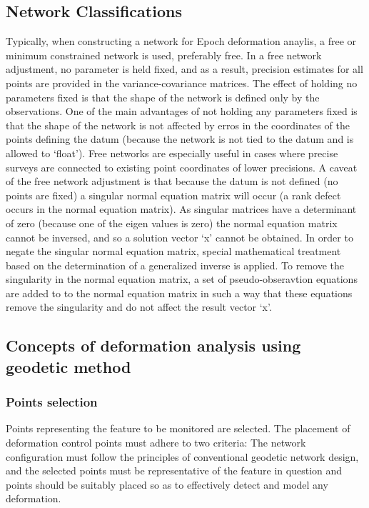 \documentclass{article}
\begin{document}
\subsection{Network Classifications}
Typically, when constructing a network for Epoch deformation anaylis,
a free or minimum constrained network is used, preferably free. In a free
network adjustment, no parameter is held fixed, and as a result, precision
estimates for all points are provided in the variance-covariance matrices.
The effect of holding no parameters fixed is that the shape of the network
is defined only by the observations. One of the main advantages of not holding
any parameters fixed is that the shape of the network is not affected by erros in
the coordinates of the points defining the datum (because the network is not tied
to the datum and is allowed to `float'). Free networks are especially useful
in cases where precise surveys are connected to existing point coordinates
of lower precisions. A caveat of the free network adjustment is that because the
datum is not defined (no points are fixed) a singular normal equation matrix
will occur (a rank defect occurs in the normal equation matrix).
As singular matrices have a determinant of zero (because one of the
eigen values is zero) the normal equation matrix cannot be inversed, and so
a solution vector `x' cannot be obtained. In order to negate the singular normal
equation matrix, special mathematical treatment based on the determination of a
generalized inverse is applied. To remove the singularity in the normal equation
matrix, a set of pseudo-obseravtion equations are added to to the normal
equation matrix in such a way that these equations remove the singularity and
do not affect the result vector `x'.

\subsection{Concepts of deformation analysis using geodetic method}

\subsubsection{Points selection}
Points representing the feature to be monitored are selected.
The placement of deformation control points must adhere to two criteria:
The network configuration must follow the principles of conventional geodetic
network design, and the selected points must be representative of the feature
in question and points should be suitably placed so as to effectively detect and
model any deformation.
\end{document}
